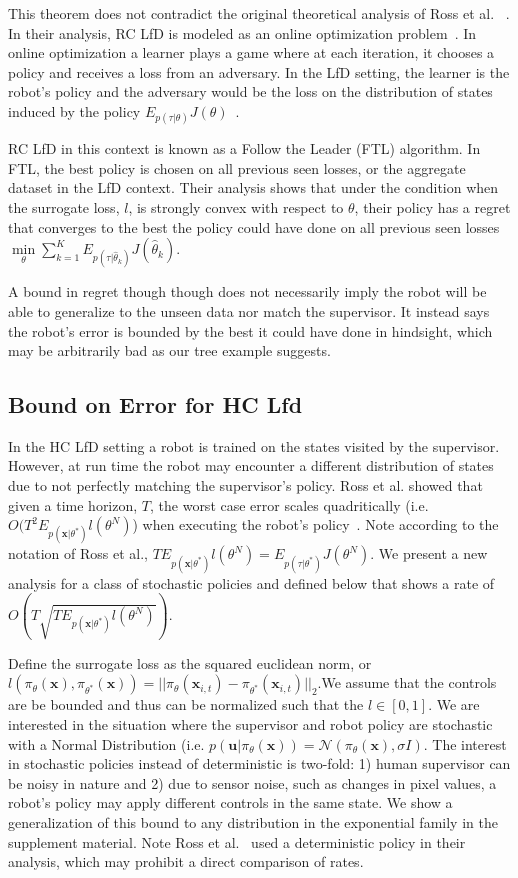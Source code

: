 \documentclass[10pt, conference]{ieeeconf}      %
\newcommand{\bu}{\mathbf{u}}
\newcommand{\bx}{\mathbf{x}}
\begin{document}
This theorem does not contradict the original theoretical analysis of Ross et al. ~\cite{ross2010reduction}. In their analysis, RC LfD is modeled as an online optimization problem~\cite{ross2010reduction}.  In online optimization a learner plays a game where at each iteration, it chooses a policy and receives a loss from an adversary.  In the LfD setting, the learner is the robot's policy and the adversary would be the loss on the distribution of states induced by the policy $E_{p(\tau|\theta)} J(\theta)$~\cite{shalev2011online}.

RC LfD in this context is known as a Follow the Leader (FTL) algorithm. In FTL, the best policy is chosen on all previous seen losses, or the aggregate dataset in the LfD context. Their analysis shows that under the condition when the surrogate loss, $l$, is strongly convex with respect to $\theta$, their policy has a regret that converges to the best the policy could have done on all previous seen losses $\underset{\theta}{\min} \sum_{k=1}^K E_{p(\tau|\hat{\theta}_k)}J(\hat{\theta}_k)$. 

A bound in regret though though does not necessarily imply the robot will be able to generalize to the unseen data nor match the supervisor. It instead says the robot's error is bounded by the best it could have done in hindsight, which may be arbitrarily bad as our tree example suggests. 

\subsection{Bound on Error for HC Lfd}
In the HC LfD setting a robot is trained on the states visited by the supervisor. However, at run time the robot may encounter a different distribution of states due to not perfectly matching the supervisor's policy. Ross et al. showed that given a time horizon, $T$, the worst case error scales quadritically (i.e. $O(T^2E_{p(\bx|\theta^*)} l(\theta^N)$) when executing the robot's policy~\cite{ross2010efficient}. Note according to the notation of Ross et al., $TE_{p(\bx|\theta^*)} l(\theta^N) = E_{p(\tau|\theta^*)} J(\theta^N)$. We present a new analysis for a class of stochastic policies and  defined below that shows a rate of $O(T\sqrt{TE_{p(\bx|\theta^*)} l(\theta^N)})$.

 Define the surrogate loss as the squared euclidean norm, or $l(\pi_{\theta}(\bx),\pi_{\theta^*}(\bx)) = ||\pi_{\theta}(\bx_{i,t}) - \pi_{\theta^*}(\bx_{i,t})||_2$.We assume that the controls are be bounded and thus can be normalized such that the $l \in [0,1]$.  We are interested in the situation where the supervisor and robot policy are stochastic with a Normal Distribution (i.e. $p(\bu|\pi_{\theta}(\bx)) = \mathcal{N}(\pi_\theta(\bx),\sigma I)$. The interest in stochastic policies instead of deterministic is two-fold: 1) human supervisor can be noisy in nature and 2) due to sensor noise, such as changes in pixel values, a robot's policy may apply different controls in the same state. We show a generalization of this bound to any distribution in the exponential family in the supplement material.  Note Ross et al.~\cite{ross2010reduction} used a deterministic policy in their analysis, which may prohibit a direct comparison of rates.
 
\end{document}
